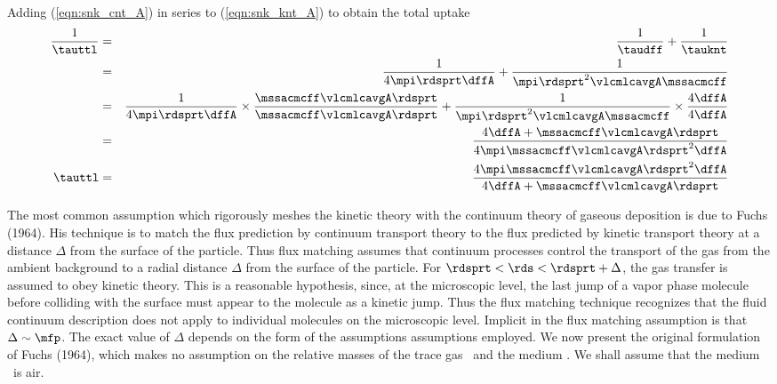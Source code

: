 \documentclass[12pt,twoside]{book}
\begin{document}
Adding (\ref{eqn:snk_cnt_A}) in series to (\ref{eqn:snk_knt_A}) to
obtain the total uptake 
\begin{eqnarray}
\frac{1}{\tauttl } & = & \frac{1}{\taudff } + \frac{1}{\tauknt }
\nonumber \\
& = & \frac{1}{4 \mpi \rdsprt \dffA } + \frac{1}{\mpi \rdsprt^{2}
\vlcmlcavgA \mssacmcff } \nonumber \\
& = & \frac{1}{4 \mpi \rdsprt \dffA } \times
\frac{\mssacmcff \vlcmlcavgA \rdsprt}{\mssacmcff \vlcmlcavgA \rdsprt } +
\frac{1}{\mpi \rdsprt^{2} \vlcmlcavgA \mssacmcff } \times
\frac{4 \dffA}{4 \dffA } \nonumber \\
& = & \frac{4 \dffA + \mssacmcff \vlcmlcavgA \rdsprt}{
4 \mpi \mssacmcff \vlcmlcavgA \rdsprt^{2} \dffA } \nonumber \\
\tauttl & = & \frac{4 \mpi \mssacmcff \vlcmlcavgA \rdsprt^{2} \dffA}{
4 \dffA + \mssacmcff \vlcmlcavgA \rdsprt } 
\label{eqn:snk_ttl_A}
\end{eqnarray}

The most common assumption which rigorously meshes the kinetic theory
with the continuum theory of gaseous deposition is due to Fuchs (1964).
His technique is to match the flux prediction by continuum transport
theory to the flux predicted by kinetic transport theory at a distance
$\Delta$ from the surface of the particle.
Thus flux matching assumes that continuum processes control the
transport of the gas from the ambient background to a radial distance
$\Delta$ from the surface of the particle.
For $\rdsprt < \rds < \rdsprt + \Delta$, the gas transfer is assumed
to obey kinetic theory.
This is a reasonable hypothesis, since, at the microscopic level, the
last jump of a vapor phase molecule before colliding with the surface
must appear to the molecule as a kinetic jump.
Thus the flux matching technique recognizes that the fluid continuum
description does not apply to individual molecules on the microscopic
level.
Implicit in the flux matching assumption is that $\Delta \sim \mfp$.
The exact value of $\Delta$ depends on the form of the assumptions
assumptions employed.
We now present the original formulation of Fuchs (1964), which makes
no assumption on the relative masses of the trace gas \A\ and the
medium \B.
We shall assume that the medium \B\ is air.
\end{document}
